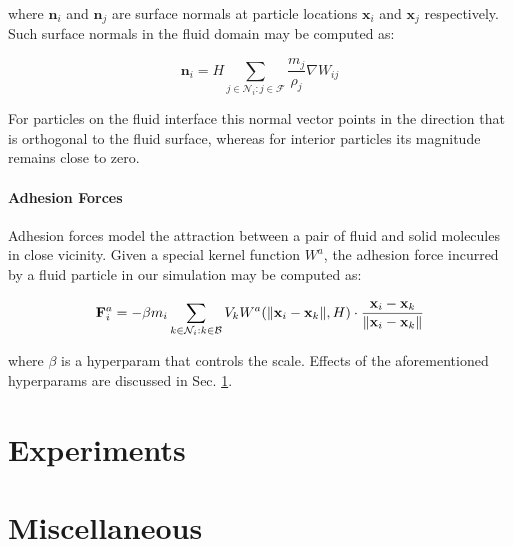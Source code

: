 \documentclass[
	11pt, 
	DIV10,
	ngerman,
	a4paper, 
	oneside, 
	headings=normal, 
	captions=tableheading,
	final, 
	numbers=noenddot
]{scrartcl}
\DeclarePairedDelimiter{\norm}{\lVert}{\rVert}
\begin{document}
where $ \mathbf{n}_{i} $ and $ \mathbf{n}_{j} $ are surface normals at particle locations $ \mathbf{x}_{i} $ and $ \mathbf{x}_{j} $ respectively. Such surface normals in the fluid domain may be computed as:

\begin{equation}
	\label{eq27}
	\mathbf{n}_{i} = H \sum_{j \in \mathcal{N}_{i}:j \in \mathcal{F}} \frac{m_{j}}{\rho_{j}} \nabla W_{ij}
\end{equation}

For particles on the fluid interface this normal vector points in the direction that is orthogonal to the fluid surface, whereas for interior particles its magnitude remains close to zero.

\paragraph{Adhesion Forces}

Adhesion forces model the attraction between a pair of fluid and solid molecules in close vicinity. Given a special kernel function $ W^{a} $, the adhesion force incurred by a fluid particle in our simulation may be computed as:

\begin{equation}
	\label{28}
	\mathbf{F}_{i}^{a} = - \beta m_{i} \sum_{k \in \mathcal{N}_{i}:k \in \mathcal{B}} V_{k} W^{a}(\norm{\mathbf{x}_{i} - \mathbf{x}_{k}}, H) \cdot \frac{\mathbf{x}_{i} - \mathbf{x}_{k}}{\norm{\mathbf{x}_{i} - \mathbf{x}_{k}}}
\end{equation}

where $ \beta $ is a hyperparam that controls the scale. Effects of the aforementioned hyperparams are discussed in Sec. \ref{sec4}.

\section{Experiments}
\label{sec4}
\section{Miscellaneous}
\label{sec5}



\end{document}
